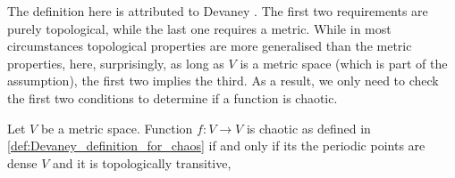 The definition here is attributed to Devaney \cite{Devaney_green_book_chaos_definition}. 
The first two requirements are purely topological, while the last one requires a metric. 
While in most circumstances topological properties are more generalised than the metric properties, here, surprisingly, as long as $V$ is a metric space (which is part of the assumption), the first two implies the third\cite{Banks}. 
As a result, we only need to check the first two conditions to determine if a function is chaotic.

\begin{thm}
	Let $V$ be a metric space. 
	Function $f: V \rightarrow V$ is chaotic as defined in \ref{def:Devaney_definition_for_chaos}
	if and only if its the periodic points are dense $V$ and it is topologically transitive,
\end{thm}


